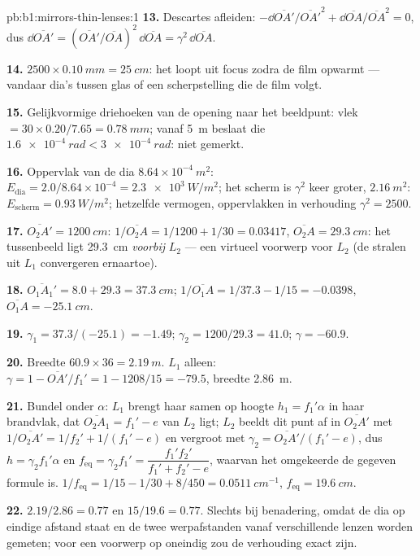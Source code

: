 \begin{solution}{pb:b1:mirrors-thin-lenses:1}
\textbf{13.} Descartes afleiden: $-\dd\overline{OA'}/\overline{OA'}^2
+ \dd\overline{OA}/\overline{OA}^2 = 0$, dus $\dd\overline{OA'} =
(\overline{OA'}/\overline{OA})^2\,\dd\overline{OA} = \gamma^2\,\dd\overline{OA}$.

\textbf{14.} $2500 \times \qty{0.10}{mm} = \qty{25}{cm}$: het 
loopt uit focus zodra de film opwarmt --- vandaar dia's tussen glas of een
scherpstelling die de film volgt.

\textbf{15.} Gelijkvormige driehoeken van de opening naar het beeldpunt:
vlek $= 30 \times 0.20/7.65 = \qty{0.78}{mm}$; vanaf \qty{5}{m} beslaat die
$\qty{1.6e-4}{rad} < \qty{3e-4}{rad}$: niet gemerkt.

\textbf{16.} Oppervlak van de dia $8.64\times10^{-4}\ \unit{m^2}$: $E_{\text{dia}}
= 2.0/8.64\times10^{-4} = \qty{2.3e3}{W/m^2}$; het scherm is $\gamma^2$
keer groter, $\qty{2.16}{m^2}$: $E_{\text{scherm}} = \qty{0.93}{W/m^2}$;
hetzelfde vermogen, oppervlakken in verhouding $\gamma^2 = 2500$.

\textbf{17.} $\overline{O_2A'} = \qty{1200}{cm}$: $1/\overline{O_2A} =
1/1200 + 1/30 = 0.03417$, $\overline{O_2A} = \qty{+29.3}{cm}$: het
tussenbeeld ligt \qty{29.3}{cm} \emph{voorbij} $L_2$ --- een virtueel
voorwerp voor $L_2$ (de stralen uit $L_1$ convergeren ernaartoe).

\textbf{18.} $\overline{O_1A_1'} = 8.0 + 29.3 = \qty{37.3}{cm}$;
$1/\overline{O_1A} = 1/37.3 - 1/15 = -0.0398$, $\overline{O_1A} =
\qty{-25.1}{cm}$.

\textbf{19.} $\gamma_1 = 37.3/(-25.1) = -1.49$; $\gamma_2 = 1200/29.3 =
41.0$; $\gamma = -60.9$.

\textbf{20.} Breedte $60.9 \times 36 = \qty{2.19}{m}$. $L_1$ alleen:
$\gamma = 1 - \overline{OA'}/f_1' = 1 - 1208/15 = -79.5$, breedte
\qty{2.86}{m}.

\textbf{21.} Bundel onder $\alpha$: $L_1$ brengt haar samen op hoogte $h_1 = f_1'\alpha$
in haar brandvlak, dat $\overline{O_2A_1} = f_1' - e$ van $L_2$ ligt;
$L_2$ beeldt dit punt af in $\overline{O_2A'}$ met $1/\overline{O_2A'}
= 1/f_2' + 1/(f_1' - e)$ en vergroot met $\gamma_2 = \overline{O_2A'}/(f_1'
- e)$, dus $h = \gamma_2 f_1'\alpha$ en $f_{\mathrm{eq}} = \gamma_2 f_1'
= \dfrac{f_1' f_2'}{f_1' + f_2' - e}$, waarvan het omgekeerde de gegeven
formule is. $1/f_{\mathrm{eq}} = 1/15 - 1/30 + 8/450 = \qty{0.0511}{cm^{-1}}$,
$f_{\mathrm{eq}} = \qty{19.6}{cm}$.

\textbf{22.} $2.19/2.86 = 0.77$ en $15/19.6 = 0.77$. Slechts bij benadering,
omdat de dia op eindige afstand staat en de twee werpafstanden vanaf
verschillende lenzen worden gemeten; voor een voorwerp op oneindig zou de
verhouding exact zijn.


\end{solution}
